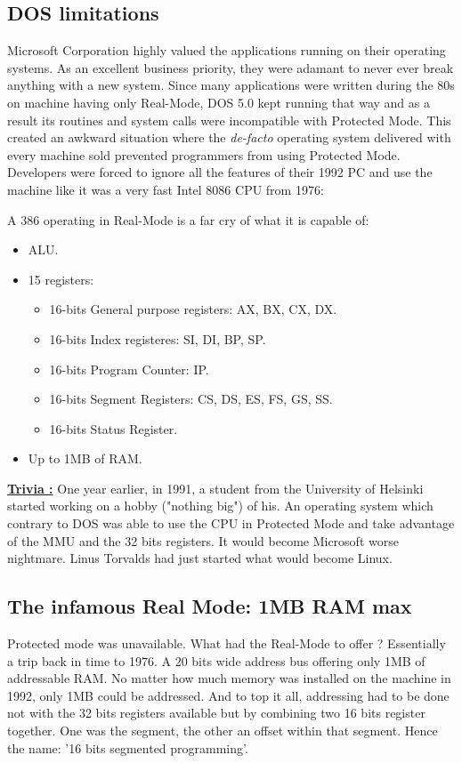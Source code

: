 \documentclass[book.tex]{subfiles}
\begin{document}
  \subsection{DOS limitations}
  Microsoft Corporation highly valued the applications running on their operating systems. As an excellent business priority, they were adamant to never ever break anything with a new system.  Since many applications were written during the 80s on machine having only Real-Mode, DOS 5.0 kept running that way and as a result its routines and system calls were incompatible with Protected Mode. This created an awkward situation where the \emph{de-facto} operating system delivered with every machine sold prevented programmers from using Protected Mode. Developers were forced to ignore all the features of their 1992 PC and use the machine like it was a very fast Intel 8086 CPU from 1976:\\
\par
  A 386 operating in Real-Mode is a far cry of what it is capable of:\\
\begin{itemize}
\item ALU.
\item 15 registers:
\begin{itemize}
  \item 16-bits General purpose registers: AX, BX, CX, DX.
  \item 16-bits Index registeres: SI, DI, BP, SP.
  \item 16-bits Program Counter: IP.
  \item 16-bits Segment Registers: CS, DS, ES, FS, GS, SS.
  \item 16-bits Status Register.
\end{itemize}
\item Up to 1MB of RAM.
\end{itemize}


\bigskip

 \textbf{\underline{Trivia :}} One year earlier, in 1991, a student from the University of Helsinki started working on a hobby ("nothing big") of his. An operating system which contrary to DOS was able to use the CPU in Protected Mode and take advantage of the MMU and the 32 bits registers. It would become Microsoft worse nightmare. Linus Torvalds had just started what would become Linux.



  \subsection{The infamous Real Mode: 1MB RAM max}
  Protected mode was unavailable. What had the Real-Mode to offer ? Essentially a trip back in time to 1976. A 20 bits wide address bus offering only 1MB of addressable RAM. No matter how much memory was installed on the machine in 1992, only 1MB could be addressed. And to top it all, addressing had to be done not with the 32 bits registers available but by combining two 16 bits register together. One was the segment, the other an offset within that segment. Hence the name: '16 bits segmented programming'.
\end{document}
